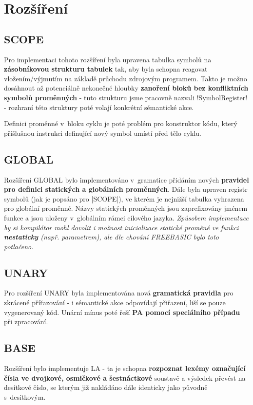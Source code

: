 \newpage
\section{Rozšíření}
\begin{multicols}{2}

\subsection{SCOPE}
Pro implementaci tohoto rozšíření byla upravena tabulka symbolů na \textbf{zásobníkovou strukturu tabulek} tak, aby byla schopna reagovat vložením/výjmutím na základě průchodu zdrojovým programem.
Takto je možno dosáhnout až potenciálně nekonečné hloubky \textbf{zanoření bloků bez konfliktních symbolů proměnných} - tuto strukturu jsme pracovně nazvali \ic!SymbolRegister! - rozhraní této struktury poté volají konkrétní sémantické akce.

Definici proměnné v~bloku cyklu je poté problém pro konstruktor kódu, který příšlušnou instrukci definující nový symbol umístí před tělo cyklu.

\subsection{GLOBAL}
Rozšíření GLOBAL bylo implementováno v~gramatice přidáním
nových \textbf{pravidel pro definici statických a globálních proměnných}.
Dále byla upraven registr symbolů (jak je popsáno pro \ic|SCOPE|),
ve kterém je nejnižší tabulka vyhrazena
pro globální proměnné. Názvy statických proměnných jsou zaprefixovány
jménem funkce a jsou uloženy v~globálním rámci cílového jazyka. 
\emph{Způsobem implementace by si kompilátor mohl dovolit i možnost inicializace statické proměné ve funkci \textbf{nestaticky} (např. parametrem), ale dle chování FREEBASIC bylo toto potlačeno.}

\subsection{UNARY}
Pro rozšíření UNARY byla implementována nová \textbf{gramatická pravidla} pro zkrácené přířazování - i sémantické akce odpovídají přiřazení, liší se pouze vygenerovaný kód. Unární mínus poté řeší \textbf{PA pomocí speciálního případu} při zpracování.

\subsection{BASE}
Rozšíření bylo implementuje LA - ta je schopna \textbf{rozpoznat
lexémy označující čísla ve dvojkové, osmičkové a šestnáctkové} soustavě a
výsledek převést na desítkové číslo, se kterým již nakládáno dále identicky jako původně s~desítkovým.


\end{multicols}
